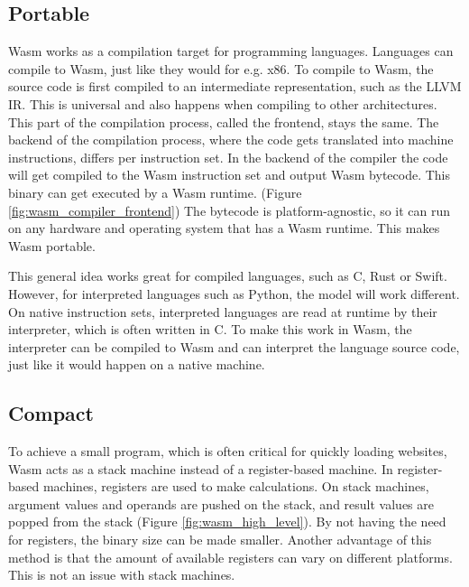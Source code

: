 \subsection{Portable}
\acrfull{Wasm} works as a compilation target for programming languages. Languages can compile to Wasm, just like they would for e.g. x86.
To compile to Wasm, the source code is first compiled to an intermediate representation, such as the LLVM IR. This is universal and also happens when compiling to other architectures. This part of the compilation process, called the frontend, stays the same. The backend of the compilation process, where the code gets translated into machine instructions, differs per instruction set. In the backend of the compiler the code will get compiled to the Wasm instruction set and output Wasm bytecode. This binary can get executed by a Wasm runtime. (Figure \ref{fig:wasm_compiler_frontend}) The bytecode is platform-agnostic, so it can run on any hardware and operating system that has a Wasm runtime. This makes Wasm portable.

This general idea works great for compiled languages, such as C, Rust or Swift. However, for interpreted languages such as Python, the model will work different. On native instruction sets, interpreted languages are read at runtime by their interpreter, which is often written in C. To make this work in Wasm, the interpreter can be compiled to Wasm and can interpret the language source code, just like it would happen on a native machine.

\subsection{Compact}
To achieve a small program, which is often critical for quickly loading websites, Wasm acts as a stack machine instead of a register-based machine. In register-based machines, registers are used to make calculations. On stack machines, argument values and operands are pushed on the stack, and result values are popped from the stack (Figure \ref{fig:wasm_high_level}). \cite{bringing_the_web_up_to_speed} By not having the need for registers, the binary size can be made smaller. \cite{stack_vs_register_machine} Another advantage of this method is that the amount of available registers can vary on different platforms. This is not an issue with stack machines.

